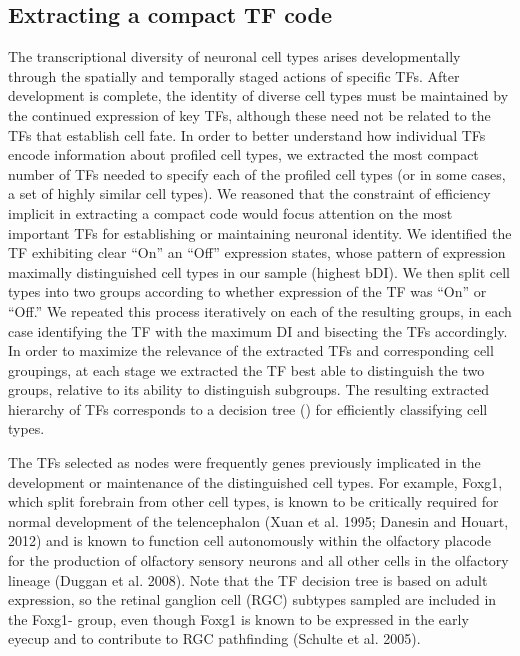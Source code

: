 \subsection{Extracting a compact TF code}
The transcriptional diversity of neuronal cell types arises developmentally through the spatially and temporally staged actions of specific TFs. After development is complete, the identity of diverse cell types must be maintained by the continued expression of key TFs, although these need not be related to the TFs that establish cell fate. In order to better understand how individual TFs encode information about profiled cell types, we extracted the most compact number of TFs needed to specify each of the profiled cell types (or in some cases, a set of highly similar cell types). We reasoned that the constraint of efficiency implicit in extracting a compact code would focus attention on the most important TFs for establishing or maintaining neuronal identity. We identified the TF exhibiting clear “On” an “Off” expression states, whose pattern of expression maximally distinguished cell types in our sample (highest bDI). We then split cell types into two groups according to whether expression of the TF was “On” or “Off.” We repeated this process iteratively on each of the resulting groups, in each case identifying the TF with the maximum DI and bisecting the TFs accordingly. In order to maximize the relevance of the extracted TFs and corresponding cell groupings, at each stage we extracted the TF best able to distinguish the two groups, relative to its ability to distinguish subgroups. The resulting extracted hierarchy of TFs corresponds to a decision tree () for efficiently classifying cell types.

The TFs selected as nodes were frequently genes previously implicated in the development or maintenance of the distinguished cell types. For example, Foxg1, which split forebrain from other cell types, is known to be critically required for normal development of the telencephalon (Xuan et al. 1995; Danesin and Houart, 2012) and is known to function cell autonomously within the olfactory placode for the production of olfactory sensory neurons and all other cells in the olfactory lineage (Duggan et al. 2008). Note that the TF decision tree is based on adult expression, so the retinal ganglion cell (RGC) subtypes sampled are included in the Foxg1- group, even though Foxg1 is known to be expressed in the early eyecup and to contribute to RGC pathfinding (Schulte et al. 2005).

